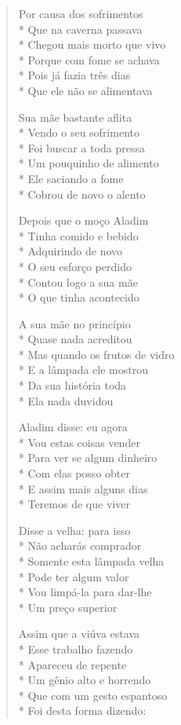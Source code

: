 \begin{verse}
Por causa dos sofrimentos\\*
Que na caverna passava\\*
Chegou mais morto que vivo\\*
Porque com fome se achava\\*
Pois já fazia três dias\\*
Que ele não se alimentava

Sua mãe bastante aflita\\*
Vendo o seu sofrimento\\*
Foi buscar a toda pressa\\*
Um pouquinho de alimento\\*
Ele saciando a fome\\*
Cobrou de novo o alento

Depois que o moço Aladim\\*
Tinha comido e bebido\\*
Adquirindo de novo\\*
O seu esforço perdido\\*
Contou logo a sua mãe\\*
O que tinha acontecido

A sua mãe no princípio\\*
Quase nada acreditou\\*
Mas quando os frutos de vidro\\*
E a lâmpada ele mostrou\\*
Da sua história toda\\*
Ela nada duvidou

Aladim disse: eu agora\\*
Vou estas coisas vender\\*
Para ver se algum dinheiro\\*
Com elas posso obter\\*
E assim mais alguns dias\\*
Teremos de que viver

Disse a velha: para isso\\*
Não acharás comprador\\*
Somente esta lâmpada velha\\*
Pode ter algum valor\\*
Vou limpá-la para dar-lhe\\*
Um preço superior

Assim que a viúva estava\\*
Esse trabalho fazendo\\*
Apareceu de repente\\*
Um gênio alto e horrendo\\*
Que com um gesto espantoso\\*
Foi desta forma dizendo:


\end{verse}
